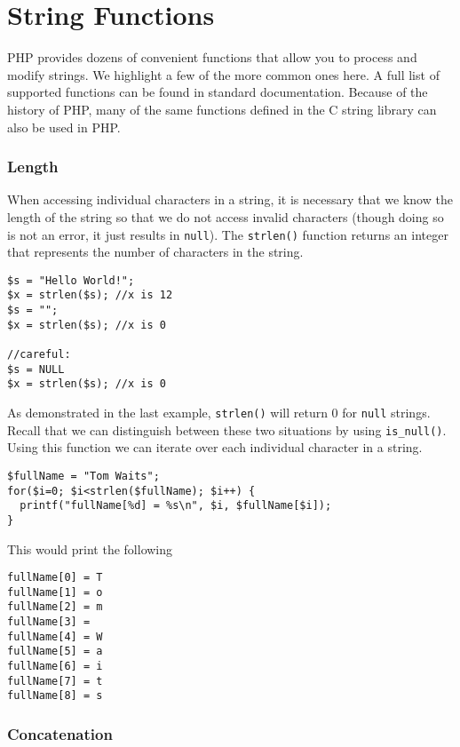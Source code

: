 \section{String Functions}

PHP provides dozens of convenient functions that allow 
you to process and modify strings.  We highlight a few 
of the more common ones here.  A full list of supported 
functions can be found in standard documentation.  Because
of the history of PHP, many of the same functions defined in
the C string library can also be used in PHP.

\subsubsection{Length}

When accessing individual characters in a string, it
is necessary that we know the length of the string so
that we do not access invalid characters (though doing
so is not an error, it just results in \texttt{null}).
The \texttt{strlen()} function returns an
integer that represents the number of characters in the
string.  

\begin{verbatim}
$s = "Hello World!";
$x = strlen($s); //x is 12
$s = "";
$x = strlen($s); //x is 0

//careful:
$s = NULL
$x = strlen($s); //x is 0
\end{verbatim}

As demonstrated in the last example, \texttt{strlen()}
will return 0 for \texttt{null} strings.
Recall that we can distinguish between these two situations
by using \texttt{is_null()}.  Using this function
we can iterate over each individual character in a string.

\begin{verbatim}
$fullName = "Tom Waits";
for($i=0; $i<strlen($fullName); $i++) {
  printf("fullName[%d] = %s\n", $i, $fullName[$i]);
}
\end{verbatim}

This would print the following

\begin{verbatim}
fullName[0] = T
fullName[1] = o
fullName[2] = m
fullName[3] =  
fullName[4] = W
fullName[5] = a
fullName[6] = i
fullName[7] = t
fullName[8] = s
\end{verbatim}

\subsubsection{Concatenation}

